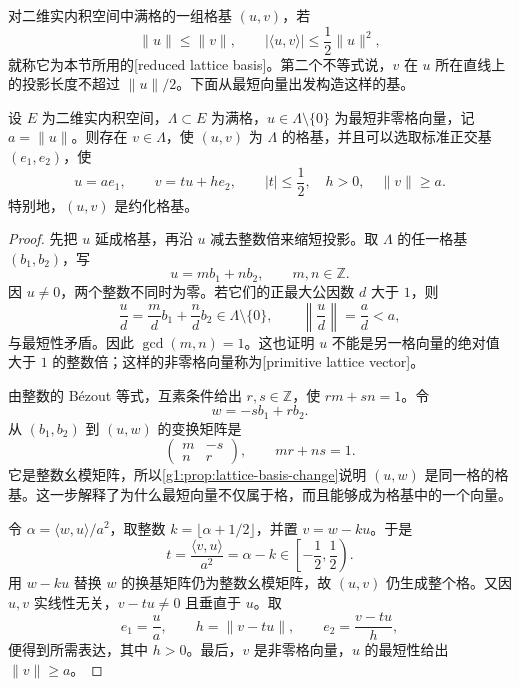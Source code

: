 对二维实内积空间中满格的一组格基 \((u,v)\)，若
\[
	\lVert u\rVert\le\lVert v\rVert,\qquad
	|\langle u,v\rangle|\le\frac12\lVert u\rVert^2,
\]
就称它为本节所用的[reduced lattice basis]。第二个不等式说，\(v\) 在 \(u\) 所在直线上的投影长度不超过 \(\lVert u\rVert/2\)。下面从最短向量出发构造这样的基。

\begin{lemma}
	\label{g1:lem:planar-reduced-lattice-basis}
	设 \(E\) 为二维实内积空间，\(\Lambda\subset E\) 为满格，\(u\in\Lambda\setminus\{0\}\) 为最短非零格向量，记 \(a=\lVert u\rVert\)。则存在 \(v\in\Lambda\)，使 \((u,v)\) 为 \(\Lambda\) 的格基，并且可以选取标准正交基 \((e_1,e_2)\)，使
	\[
		u=ae_1,\qquad v=tu+he_2,
		\qquad |t|\le\frac12,\quad h>0,\quad\lVert v\rVert\ge a.
	\]
	特别地，\((u,v)\) 是约化格基。
\end{lemma}
\begin{proof}
	先把 \(u\) 延成格基，再沿 \(u\) 减去整数倍来缩短投影。取 \(\Lambda\) 的任一格基 \((b_1,b_2)\)，写
	\[
		u=mb_1+nb_2,\qquad m,n\in\mathbb Z.
	\]
	因 \(u\ne0\)，两个整数不同时为零。若它们的正最大公因数 \(d\) 大于 \(1\)，则
	\[
		\frac ud=\frac md b_1+\frac nd b_2\in\Lambda\setminus\{0\},\qquad
		\left\lVert\frac ud\right\rVert=\frac ad<a,
	\]
	与最短性矛盾。因此 \(\gcd(m,n)=1\)。这也证明 \(u\) 不能是另一格向量的绝对值大于 \(1\) 的整数倍；这样的非零格向量称为[primitive lattice vector]。

	由整数的 Bézout 等式，互素条件给出 \(r,s\in\mathbb Z\)，使 \(rm+sn=1\)。令
	\[
		w=-sb_1+rb_2.
	\]
	从 \((b_1,b_2)\) 到 \((u,w)\) 的变换矩阵是
	\[
		\begin{pmatrix}m&-s\\n&r\end{pmatrix},\qquad mr+ns=1.
	\]
	它是整数幺模矩阵，所以\cref{g1:prop:lattice-basis-change}说明 \((u,w)\) 是同一格的格基。这一步解释了为什么最短向量不仅属于格，而且能够成为格基中的一个向量。

	令 \(\alpha=\langle w,u\rangle/a^2\)，取整数 \(k=\lfloor\alpha+1/2\rfloor\)，并置 \(v=w-ku\)。于是
	\[
		t=\frac{\langle v,u\rangle}{a^2}=\alpha-k\in\left[-\frac12,\frac12\right).
	\]
	用 \(w-ku\) 替换 \(w\) 的换基矩阵仍为整数幺模矩阵，故 \((u,v)\) 仍生成整个格。又因 \(u,v\) 实线性无关，\(v-tu\ne0\) 且垂直于 \(u\)。取
	\[
		e_1=\frac ua,\qquad h=\lVert v-tu\rVert,\qquad
		e_2=\frac{v-tu}{h},
	\]
	便得到所需表达，其中 \(h>0\)。最后，\(v\) 是非零格向量，\(u\) 的最短性给出 \(\lVert v\rVert\ge a\)。
\end{proof}

